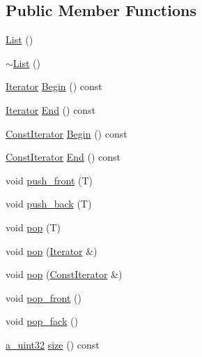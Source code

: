 \subsection*{Public Member Functions}
\begin{DoxyCompactItemize}
\item 
\hyperlink{class_agmd_utilities_1_1_list_ae5963868698d45b8d4d727b1ef9b9e34}{List} ()
\item 
\hyperlink{class_agmd_utilities_1_1_list_a78d147d8fcf9a533d6a2c0d00da01b41}{$\sim$\+List} ()
\item 
\hyperlink{class_agmd_utilities_1_1_list_1_1_iterator}{Iterator} \hyperlink{class_agmd_utilities_1_1_list_a701331116713cba158b5d0863a5af719}{Begin} () const 
\item 
\hyperlink{class_agmd_utilities_1_1_list_1_1_iterator}{Iterator} \hyperlink{class_agmd_utilities_1_1_list_af59ff00810e02629acad519aa6c8b82a}{End} () const 
\item 
\hyperlink{class_agmd_utilities_1_1_list_1_1_const_iterator}{Const\+Iterator} \hyperlink{class_agmd_utilities_1_1_list_a3852119993ba99273ce9c64d4db5299c}{Begin} () const 
\item 
\hyperlink{class_agmd_utilities_1_1_list_1_1_const_iterator}{Const\+Iterator} \hyperlink{class_agmd_utilities_1_1_list_a169515767329f31f523731c2dc2299e7}{End} () const 
\item 
void \hyperlink{class_agmd_utilities_1_1_list_ab21b4d847b6210090aafae4970c3688e}{push\+\_\+front} (T)
\item 
void \hyperlink{class_agmd_utilities_1_1_list_a053a7f1ad62983074726d6fbc5e96f45}{push\+\_\+back} (T)
\item 
void \hyperlink{class_agmd_utilities_1_1_list_af1e5d4328a864c8cee3e947bae9dd2a0}{pop} (T)
\item 
void \hyperlink{class_agmd_utilities_1_1_list_a814965b08081e1b99a54978cdb1023d6}{pop} (\hyperlink{class_agmd_utilities_1_1_list_1_1_iterator}{Iterator} \&)
\item 
void \hyperlink{class_agmd_utilities_1_1_list_aa328e999c8d22f0cda0dcf78d3a452dc}{pop} (\hyperlink{class_agmd_utilities_1_1_list_1_1_const_iterator}{Const\+Iterator} \&)
\item 
void \hyperlink{class_agmd_utilities_1_1_list_a35af861e2c6a4ac905226136e22a7149}{pop\+\_\+front} ()
\item 
void \hyperlink{class_agmd_utilities_1_1_list_adfd215706ffff9a5e6f817babeb7a4d2}{pop\+\_\+fack} ()
\item 
\hyperlink{_common_defines_8h_a964296f9770051b9e4807b1f180dd416}{a\+\_\+uint32} \hyperlink{class_agmd_utilities_1_1_list_a69b756d58fdcfa3e6ef9c7eeb17c2ef5}{size} () const 
\end{DoxyCompactItemize}


